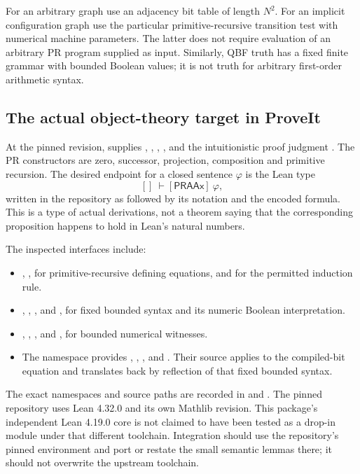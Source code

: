 For an arbitrary graph use an adjacency bit table of length \(N^2\).
For an implicit configuration graph use the particular primitive-recursive
transition test with numerical machine parameters. The latter does not
require evaluation of an arbitrary PR program supplied as input. Similarly,
QBF truth has a fixed finite grammar with bounded Boolean values; it is not
truth for arbitrary first-order arithmetic syntax.

\subsection{The actual object-theory target in ProveIt}

At the pinned revision,  supplies
, , , , and the intuitionistic
proof judgment . The PR constructors are zero, successor,
projection, composition and primitive recursion. The desired endpoint for
a closed sentence \(\varphi\) is the Lean type
\[
  []\ \vdash[\mathsf{PRAAx}]\ \varphi,
\]
written in the repository as
 followed by its
\code{\(\vdash\)[PRAAx]} notation and the encoded formula.
This is a type of actual derivations, not a theorem saying that the
corresponding proposition happens to hold in Lean's natural numbers.

The inspected interfaces include:
\begin{itemize}
\item {}, ,  for
primitive-recursive defining equations, and  for the
permitted induction rule.
\item {}, ,
, and , for fixed bounded syntax and its
numeric Boolean interpretation.
\item {}, ,
, and , for bounded numerical witnesses.
\item The  namespace provides
, ,
, and . Their
source applies  to the compiled-bit equation and translates
back by reflection of that fixed bounded syntax.
\end{itemize}

The exact namespaces and source paths are recorded in
 and .
The pinned repository uses Lean 4.32.0 and its own Mathlib revision. This
package's independent Lean 4.19.0 core is not claimed to have been tested
as a drop-in module under that different toolchain. Integration should use
the repository's pinned environment and port or restate the small semantic
lemmas there; it should not overwrite the upstream toolchain.


